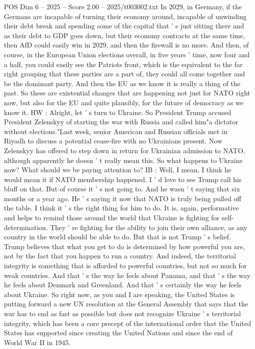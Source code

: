 \begin{textsample}{POS Dim 6 – 2025 – Score 2.00 – 2025/t003002.txt}
In 2029, in Germany, if the Germans are incapable of turning their economy around, incapable of unwinding their debt break and spending some of the capital that ' s just sitting there and as their debt to GDP goes down, but their economy contracts at the same time, then AfD could easily win in 2029, and then the firewall is no more.
And then, of course, in the European Union elections overall, in five years ' time, now four and a half, you could easily see the Patriots front, which is the equivalent to the far right grouping that these parties are a part of, they could all come together and be the dominant party.
And then the EU as we know it is really a thing of the past.
So these are existential changes that are happening not just for NATO right now, but also for the EU and quite plausibly, for the future of democracy as we know it.
HW : Alright, let ' s turn to Ukraine.
So President Trump accused President Zelenskyy of starting the war with Russia and called him"a dictator without elections."Last week, senior American and Russian officials met in Riyadh to discuss a potential cease-fire with no Ukrainians present.
Now Zelenskyy has offered to step down in return for Ukrainian admission to NATO, although apparently he doesn ' t really mean this.
So what happens to Ukraine now?
What should we be paying attention to?
IB : Well, I mean, I think he would mean it if NATO membership happened.
I ' d love to see Trump call his bluff on that.
But of course it ' s not going to.
And he wasn ' t saying that six months or a year ago.
He ' s saying it now that NATO is truly being pulled off the table.
I think it ' s the right thing for him to do.
It is, again, performative and helps to remind those around the world that Ukraine is fighting for self-determination.
They ' re fighting for the ability to join their own alliance, as any country in the world should be able to do.
But that is not Trump ' s belief.
Trump believes that what you get to do is determined by how powerful you are, not by the fact that you happen to run a country.
And indeed, the territorial integrity is something that is afforded to powerful countries, but not so much for weak countries.
And that ' s the way he feels about Panama, and that ' s the way he feels about Denmark and Greenland.
And that ' s certainly the way he feels about Ukraine.
So right now, as you and I are speaking, the United States is putting forward a new UN resolution at the General Assembly that says that the war has to end as fast as possible but does not recognize Ukraine ' s territorial integrity, which has been a core precept of the international order that the United States has supported since creating the United Nations and since the end of World War II in 1945.

\end{textsample}
